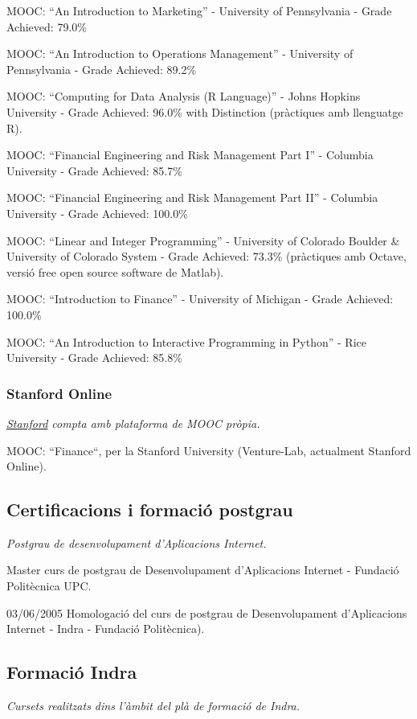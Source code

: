 \documentclass[11pt]{article}
\begin{document}
MOOC: ``An Introduction to Marketing'' - University of Pennsylvania - Grade Achieved: 79.0\%

MOOC: ``An Introduction to Operations Management'' - University of Pennsylvania - Grade Achieved: 89.2\%

MOOC: ``Computing for Data Analysis (R Language)'' - Johns Hopkins University - Grade Achieved: 96.0\% with Distinction (pràctiques amb llenguatge R).

MOOC: ``Financial Engineering and Risk Management Part I'' - Columbia University - Grade Achieved: 85.7\%

MOOC: ``Financial Engineering and Risk Management Part II'' - Columbia University - Grade Achieved: 100.0\%

MOOC: ``Linear and Integer Programming'' - University of Colorado Boulder \& University of Colorado System - Grade Achieved: 73.3\% (pràctiques amb Octave, versió free open source software de Matlab).

MOOC: ``Introduction to Finance'' - University of Michigan - Grade Achieved: 100.0\%

MOOC: ``An Introduction to Interactive Programming in Python'' - Rice University - Grade Achieved: 85.8\%
\subsubsection{Stanford Online}
\label{sec-3-1-4}

\emph{\href{http://online.stanford.edu/}{Stanford} compta amb plataforma de MOOC pròpia.}

MOOC: “Finance“, per la Stanford University (Venture-Lab, actualment Stanford Online).
\subsection{Certificacions i formació postgrau}
\label{sec-3-2}

\emph{Postgrau de desenvolupament d'Aplicacions Internet.}

Master curs de postgrau de Desenvolupament d’Aplicacions Internet - Fundació Politècnica UPC.

03/06/2005 Homologació del curs de postgrau de Desenvolupament d’Aplicacions Internet - Indra - Fundació Politècnica).
\subsection{Formació Indra}
\label{sec-3-3}

\emph{Cursets realitzats dins l'àmbit del plà de formació de Indra.}
\end{document}

